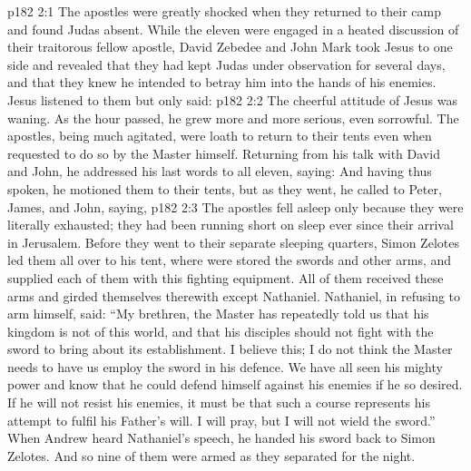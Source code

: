 \vs p182 2:1 The apostles were greatly shocked when they returned to their camp and found Judas absent. While the eleven were engaged in a heated discussion of their traitorous fellow apostle, David Zebedee and John Mark took Jesus to one side and revealed that they had kept Judas under observation for several days, and that they knew he intended to betray him into the hands of his enemies. Jesus listened to them but only said: 
\vs p182 2:2 The cheerful attitude of Jesus was waning. As the hour passed, he grew more and more serious, even sorrowful. The apostles, being much agitated, were loath to return to their tents even when requested to do so by the Master himself. Returning from his talk with David and John, he addressed his last words to all eleven, saying:  And having thus spoken, he motioned them to their tents, but as they went, he called to Peter, James, and John, saying, 
\vs p182 2:3 The apostles fell asleep only because they were literally exhausted; they had been running short on sleep ever since their arrival in Jerusalem. Before they went to their separate sleeping quarters, Simon Zelotes led them all over to his tent, where were stored the swords and other arms, and supplied each of them with this fighting equipment. All of them received these arms and girded themselves therewith except Nathaniel. Nathaniel, in refusing to arm himself, said: “My brethren, the Master has repeatedly told us that his kingdom is not of this world, and that his disciples should not fight with the sword to bring about its establishment. I believe this; I do not think the Master needs to have us employ the sword in his defence. We have all seen his mighty power and know that he could defend himself against his enemies if he so desired. If he will not resist his enemies, it must be that such a course represents his attempt to fulfil his Father’s will. I will pray, but I will not wield the sword.” When Andrew heard Nathaniel’s speech, he handed his sword back to Simon Zelotes. And so nine of them were armed as they separated for the night.
